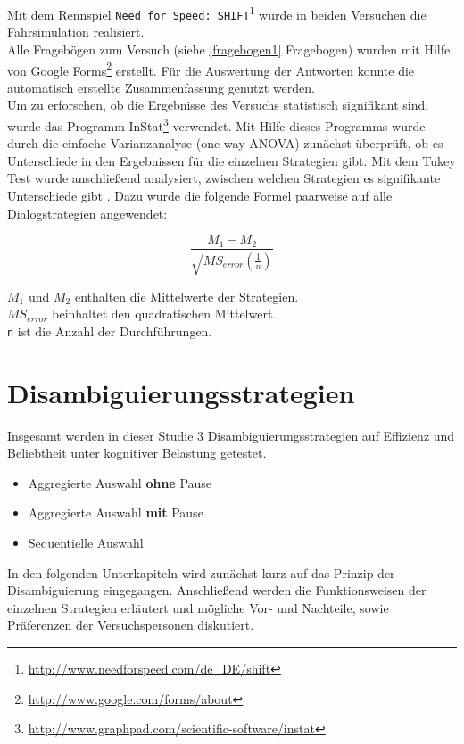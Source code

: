 \documentclass[12pt,a4paper]{scrartcl}
\begin{document}
Mit dem Rennspiel \texttt{Need for Speed: SHIFT}\footnote{\label{foot:nfs}\url{http://www.needforspeed.com/de_DE/shift}} wurde in beiden Versuchen die Fahrsimulation realisiert.\\

Alle Fragebögen zum Versuch (siehe \ref{fragebogen1} Fragebogen) wurden mit Hilfe von Google Forms\footnote{\label{foot:googelforms}\url{
http://www.google.com/forms/about}} erstellt. Für die Auswertung der Antworten konnte die automatisch erstellte Zusammenfassung genutzt werden.\\

Um zu erforschen, ob die Ergebnisse des Versuchs statistisch signifikant sind, wurde das Programm InStat\footnote{\label{foot:googelforms}\url{
http://www.graphpad.com/scientific-software/instat}} verwendet. 
Mit Hilfe dieses Programms wurde durch die einfache Varianzanalyse (one-way ANOVA) zunächst überprüft, ob es Unterschiede in den Ergebnissen für die einzelnen Strategien gibt. Mit dem Tukey Test wurde anschließend analysiert, zwischen welchen Strategien es signifikante Unterschiede gibt \cite{TukeyTest}. Dazu wurde die folgende Formel paarweise auf alle Dialogstrategien angewendet:

\begin{equation*}
\frac{M_1 - M_2}{\sqrt{MS_{error} (\frac{1}{n})}}
\end{equation*}

\texttt{$M_1$} und \texttt{$M_2$} enthalten die Mittelwerte der Strategien. \\
\texttt{$MS_{error}$} beinhaltet den quadratischen Mittelwert.\\
\texttt{n} ist die Anzahl der Durchführungen.






\section{Disambiguierungsstrategien}
\label{disambiguierungsstrategien}
Insgesamt werden in dieser Studie 3 Disambiguierungsstrategien auf Effizienz und Beliebtheit unter kognitiver Belastung getestet.
\begin{itemize}
\item Aggregierte Auswahl \textbf{ohne} Pause
\item Aggregierte Auswahl \textbf{mit} Pause
\item Sequentielle Auswahl
\end{itemize}
In den folgenden Unterkapiteln wird zunächst kurz auf das Prinzip der Disambiguierung eingegangen. Anschließend werden die Funktionsweisen der einzelnen Strategien erläutert und mögliche Vor- und Nachteile, sowie Präferenzen der Versuchspersonen diskutiert.
\end{document}
